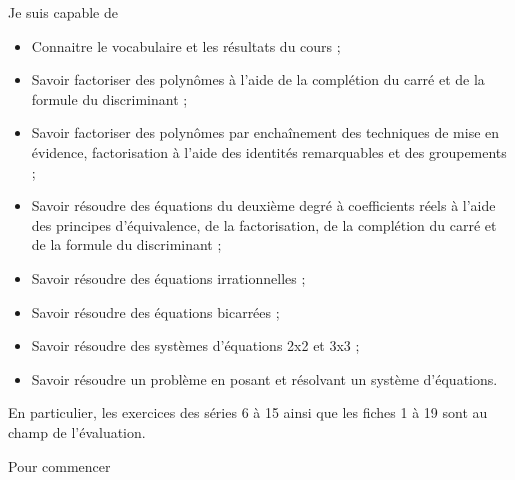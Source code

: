 \documentclass[a4paper,12pt]{report}
\begin{document}
Je suis capable de

\begin{itemize}
\item Connaitre le vocabulaire et les résultats du cours ;
\item  Savoir factoriser des polynômes à l'aide de la complétion du carré et de la formule du discriminant ;
\item  Savoir factoriser des polynômes par enchaînement des techniques de mise en évidence, factorisation à l'aide des identités remarquables et des groupements ;
\item  Savoir résoudre des équations du deuxième degré à coefficients réels à l'aide des principes d'équivalence, de la factorisation, de la complétion du carré et de la formule du discriminant ;
\item   Savoir résoudre des équations irrationnelles ;
\item   Savoir résoudre des équations bicarrées ;
\item   Savoir résoudre des systèmes d'équations 2x2 et 3x3 ;
\item    Savoir résoudre un problème en posant et résolvant un système d'équations.
\end{itemize}

En particulier, les exercices des séries 6 à 15 ainsi que les fiches 1 à 19 sont au champ de l'évaluation.

Pour commencer
\end{document}
